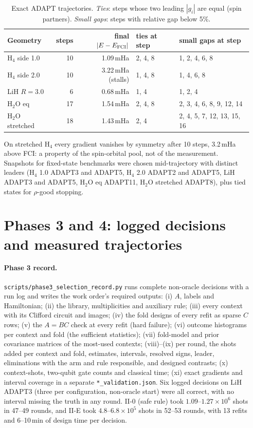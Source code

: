 \documentclass[10.5pt]{article}
\newcommand{\code}[1]{\texttt{#1}}
\begin{document}
\begin{table}[!ht]
\centering\small
\caption{Exact ADAPT trajectories. \emph{Ties}: steps whose two leading $|g_i|$ are equal (spin partners). \emph{Small gaps}: steps with relative gap below 5\%.}
\label{tab:trajectory}
\begin{tabular}{lrrll}
\toprule
Geometry & steps & final $|E-E_{\rm FCI}|$ & ties at step & small gaps at step \\
\midrule
H$_4$ side 1.0 & 10 & 1.09\,mHa & 2, 4, 8 & 1, 2, 4, 6, 8 \\
H$_4$ side 2.0 & 10 & 3.22\,mHa (stalls) & 1, 4, 8 & 1, 4, 6, 8 \\
LiH $R=3.0$ & 6 & 0.68\,mHa & 1, 4 & 1, 2, 4 \\
H$_2$O eq & 17 & 1.54\,mHa & 2, 4, 8 & 2, 3, 4, 6, 8, 9, 12, 14 \\
H$_2$O stretched & 18 & 1.43\,mHa & 2, 4 & 2, 4, 5, 7, 12, 13, 15, 16 \\
\bottomrule
\end{tabular}
\end{table}

On stretched H$_4$ every gradient vanishes by symmetry after 10 steps, 3.2\,mHa above FCI: a property of the spin-orbital pool, not of the measurement. Snapshots for fixed-state benchmarks were chosen mid-trajectory with distinct leaders (H$_4$ 1.0 ADAPT3 and ADAPT5, H$_4$ 2.0 ADAPT2 and ADAPT5, LiH ADAPT3 and ADAPT5, H$_2$O eq ADAPT11, H$_2$O stretched ADAPT8), plus tied states for $\rho$-good stopping.

\section{Phases 3 and 4: logged decisions and measured trajectories}
\label{sec:phases}

\paragraph{Phase 3 record.}
\code{scripts/phase3\_selection\_record.py} runs complete non-oracle decisions with a run log and writes the work order's required outputs: (i) $A$, labels and Hamiltonian; (ii) the library, multiplicities and auxiliary rule; (iii) every context with its Clifford circuit and images; (iv) the fold designs of every refit as sparse $C$ rows; (v) the $A=BC$ check at every refit (hard failure); (vi) outcome histograms per context and fold (the sufficient statistics); (vii) fold-model and prior covariance matrices of the most-used contexts; (viii)--(ix) per round, the shots added per context and fold, estimates, intervals, resolved signs, leader, eliminations with the arm and rule responsible, and designed contrasts; (x) context-shots, two-qubit gate counts and classical time; (xi) exact gradients and interval coverage in a separate \code{*\_validation.json}. Six logged decisions on LiH ADAPT3 (three per configuration, non-oracle start) were all correct, with no interval missing the truth in any round. II-0 (safe rule) took $1.09$--$1.27\times10^6$ shots in 47--49 rounds, and II-E took $4.8$--$6.8\times10^5$ shots in 52--53 rounds, with 13 refits and 6--10\,min of design time per decision.
\end{document}

